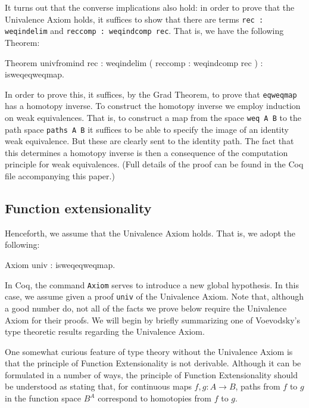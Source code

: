 It turns out that the converse implications also hold: in order to
prove that the Univalence Axiom holds, it suffices to show that there
are terms \verb|rec : weqindelim| and 
\verb|reccomp : weqindcomp rec|.  That is, we have the following
Theorem:
\begin{center}
\begin{coqcode}
Theorem univfromind {rec : weqindelim} ( reccomp : weqindcomp rec ) 
 : isweqeqweqmap. 
\end{coqcode}
\end{center}
In order to prove this, it suffices, by the Grad Theorem, to prove
that \verb|eqweqmap| has a homotopy inverse.  To construct the
homotopy inverse we employ induction on weak equivalences.  That
is, to construct a map from the space \verb|weq A B| to the path
space \verb|paths A B| it suffices to be able to specify the
image of an identity weak equivalence.  But these are clearly sent to the
identity path.  The fact that this determines a homotopy inverse is
then a consequence of the computation principle for weak
equivalences.  (Full details of the proof can be found in the Coq file
accompanying this paper.)

\subsection{Function extensionality}

Henceforth, we assume that the Univalence Axiom holds.  That is, we
adopt the following:
\begin{center}
  \begin{coqcode}
Axiom univ : isweqeqweqmap.
  \end{coqcode}
\end{center}
In Coq, the command \verb|Axiom| serves to introduce a new global
hypothesis.  In this case, we assume given a proof \verb|univ| of
the Univalence Axiom.  Note that, although a good number do, not all
of the facts we prove below require the Univalence Axiom for their
proofs.  We will begin by briefly summarizing one of Voevodsky's type
theoretic results regarding the Univalence Axiom.

One somewhat curious feature of type theory without the Univalence
Axiom is that the principle of Function Extensionality is not
derivable.  Although it can be formulated in a number of ways, the
principle of Function Extensionality should be understood as stating
that, for continuous maps $f,g\colon A\to B$, paths from $f$ to $g$ in the
function space $B^{A}$ correspond to homotopies from $f$ to $g$.


